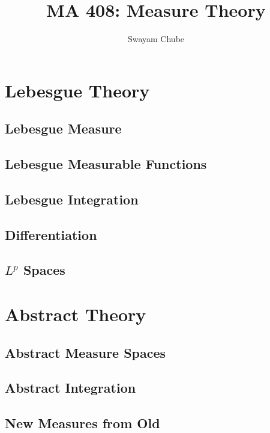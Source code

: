 \documentclass{report}
\title{MA 408: Measure Theory}
\author{Swayam Chube}
\begin{document}
\maketitle
\tableofcontents

\part*{Lebesgue Theory}
\chapter{Lebesgue Measure}


\chapter{Lebesgue Measurable Functions}


\chapter{Lebesgue Integration}


\chapter{Differentiation}


\chapter{\texorpdfstring{$L^p$}{Lp} Spaces}


\part*{Abstract Theory}

\chapter{Abstract Measure Spaces}


\chapter{Abstract Integration}


\chapter{New Measures from Old}

\end{document}

